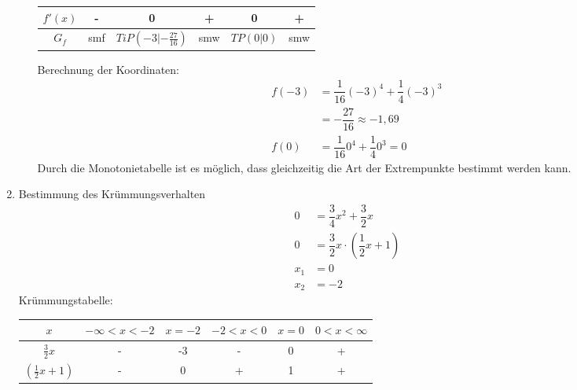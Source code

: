 \begin{bsp}{}{}
\begin{enumerate}
\begin{itemize}
\begin{center}
\begin{tabular}{||c|c|c|c|c|c||}
    $f'(x)$ & - & 0 & + & 0 & +\\ 
    \hline
    \hline
    $G_f$ & smf & $TiP(-3|-\frac{27}{16})$ & smw  & $TP(0|0) $& smw\\
    \hline
\end{tabular}
\end{center}
Berechnung der Koordinaten:
           \begin{equation*}
        \begin{split}
         f(-3)&= \dfrac{1}{16} (-3)^4 +\dfrac{1}{4} (-3)^3\\
         &= -\dfrac{27}{16}\approx -1,69\\
         f(0) &= \dfrac{1}{16} 0^4 +\dfrac{1}{4} 0^3 = 0
        \end{split}
\end{equation*}
Durch die Monotonietabelle ist es möglich, dass gleichzeitig die Art der Extrempunkte bestimmt werden kann.
    \end{itemize}
    \item Bestimmung des Krümmungsverhalten
 \begin{equation*}
        \begin{split}
         0 &= \dfrac{3}{4} x^2 +\dfrac{3}{2} x\\
         0 &= \dfrac{3}{2} x \cdot (\dfrac{1}{2}x + 1)\\
         x_1 &= 0\\
         x_2&= -2
        \end{split}
\end{equation*}
Krümmungstabelle:
\begin{center}\begin{tabular}{||c|c|c|c|c|c||}
    \hline
    $x$ & $ -\infty <x<-2 $ & $ x = -2$ &$ -2<x<0 $ & $x=0 $& $ 0<x<\infty $\\
    \hline \hline
    $\frac{3}{2} x$ & - &  -3 & - & 0 & +  \\
    \hline
    $(\frac{1}{2} x +1)$ & - & 0 & + & 1 & + \\
    \hline


\end{tabular}
\end{center}
\end{enumerate}
\end{bsp}

